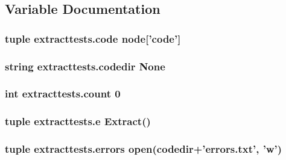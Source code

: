 \subsection{Variable Documentation}
\hypertarget{namespaceextracttests_a629a2ac1b3919c13d79e4c009892c10f}{
\subsubsection[{code}]{\setlength{\rightskip}{0pt plus 5cm}tuple extracttests.\-code node\mbox{[}'code'\mbox{]}}}\label{namespaceextracttests_a629a2ac1b3919c13d79e4c009892c10f}
\hypertarget{namespaceextracttests_a95eea71168be983462e5debd6ee1f3d8}{
\subsubsection[{codedir}]{\setlength{\rightskip}{0pt plus 5cm}string extracttests.\-codedir None}}\label{namespaceextracttests_a95eea71168be983462e5debd6ee1f3d8}
\hypertarget{namespaceextracttests_afc0659f75fa16c14ec06fb99f56327ef}{
\subsubsection[{count}]{\setlength{\rightskip}{0pt plus 5cm}int extracttests.\-count 0}}\label{namespaceextracttests_afc0659f75fa16c14ec06fb99f56327ef}
\hypertarget{namespaceextracttests_a9a4c5d70c5d35e1c5a5c6963e1cc9c55}{
\subsubsection[{e}]{\setlength{\rightskip}{0pt plus 5cm}tuple extracttests.\-e {\bf Extract}()}}\label{namespaceextracttests_a9a4c5d70c5d35e1c5a5c6963e1cc9c55}
\hypertarget{namespaceextracttests_a9a2158d8cf259035ba3b844433a98d90}{
\subsubsection[{errors}]{\setlength{\rightskip}{0pt plus 5cm}tuple extracttests.\-errors open({\bf codedir}+'errors.\-txt', 'w')}}\label{namespaceextracttests_a9a2158d8cf259035ba3b844433a98d90}
